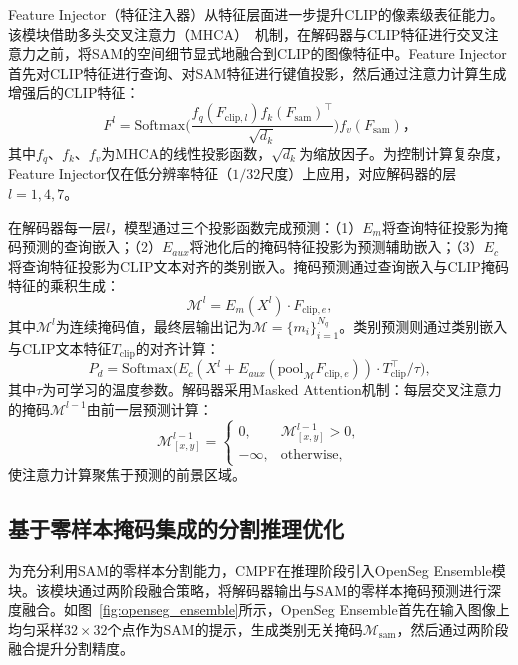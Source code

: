 Feature Injector（特征注入器）从特征层面进一步提升CLIP的像素级表征能力。该模块借助多头交叉注意力（MHCA）~\cite{vaswani2017attention}机制，在解码器与CLIP特征进行交叉注意力之前，将SAM的空间细节显式地融合到CLIP的图像特征中。Feature Injector首先对CLIP特征进行查询、对SAM特征进行键值投影，然后通过注意力计算生成增强后的CLIP特征：
\begin{equation}
F^l = \mathrm{Softmax}\bigg(\frac{f_q(F_{\text{clip},l})f_k(F_{\text{sam}})^\top}{\sqrt{d_k}}\bigg) f_v(F_{\text{sam}})，
\label{eq:feature_injector}
\end{equation}
其中$f_q$、$f_k$、$f_v$为MHCA的线性投影函数，$\sqrt{d_k}$为缩放因子。为控制计算复杂度，Feature Injector仅在低分辨率特征（$1/32$尺度）上应用，对应解码器的层$l=1,4,7$。

在解码器每一层$l$，模型通过三个投影函数完成预测：（1）$E_m$将查询特征投影为掩码预测的查询嵌入；（2）$E_{aux}$将池化后的掩码特征投影为预测辅助嵌入；（3）$E_c$将查询特征投影为CLIP文本对齐的类别嵌入。掩码预测通过查询嵌入与CLIP掩码特征的乘积生成：
\begin{equation}
\mathcal{M}^l = E_m(X^l) \cdot F_{\text{clip},e},
\label{eq:mask_pred}
\end{equation}
其中$\mathcal{M}^l$为连续掩码值，最终层输出记为$\mathcal{M}=\{m_i\}_{i=1}^{N_q}$。类别预测则通过类别嵌入与CLIP文本特征$T_{\text{clip}}$的对齐计算：
\begin{equation}
P_d = \mathrm{Softmax}\big(E_c(X^l + E_{aux}(\mathrm{pool}_{\mathcal{M}} F_{\text{clip},e})) \cdot T_{\text{clip}}^\top / \tau\big),
\label{eq:class_pred}
\end{equation}
其中$\tau$为可学习的温度参数。解码器采用Masked Attention机制：每层交叉注意力的掩码$\mathcal{M}^{l-1}$由前一层预测计算：
\begin{equation}
\mathcal{M}^{l-1}_{[x,y]} = \begin{cases} 0, & \mathcal{M}^{l-1}_{[x,y]} > 0, \\ -\infty, & \text{otherwise}, \end{cases}
\label{eq:mask_attn}
\end{equation}
使注意力计算聚焦于预测的前景区域。

\subsection{基于零样本掩码集成的分割推理优化}

\label{sec:chap4_openseg_ensemble}

为充分利用SAM的零样本分割能力，CMPF在推理阶段引入OpenSeg Ensemble模块。该模块通过两阶段融合策略，将解码器输出与SAM的零样本掩码预测进行深度融合。如图~\ref{fig:openseg_ensemble}所示，OpenSeg Ensemble首先在输入图像上均匀采样$32\times 32$个点作为SAM的提示，生成类别无关掩码$\mathcal{M}_{\text{sam}}$，然后通过两阶段融合提升分割精度。

